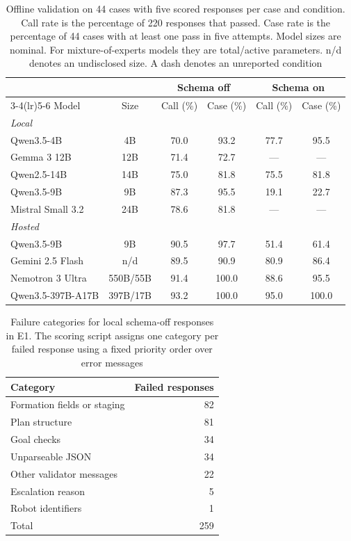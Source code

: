 \documentclass[pdflatex,sn-mathphys-num]{sn-jnl}
\begin{document}
\begin{table}[!htbp]
\centering
\caption{Offline validation on 44 cases with five scored responses per case
and condition. Call rate is the percentage of 220 responses that passed.
Case rate is the percentage of 44 cases with at least one pass in five
attempts. Model sizes are nominal. For mixture-of-experts models they are
total/active parameters. n/d denotes an undisclosed size. A dash denotes an
unreported condition}
\label{tab:e1}
\setlength{\tabcolsep}{3.2pt}
\begin{tabular}{lccccc}
\toprule
& & \multicolumn{2}{c}{Schema off} & \multicolumn{2}{c}{Schema on} \\
\cmidrule(lr){3-4}\cmidrule(lr){5-6}
Model & Size & Call (\%) & Case (\%) & Call (\%) & Case (\%) \\
\midrule
\multicolumn{6}{l}{\emph{Local}}\\
Qwen3.5-4B & 4B & 70.0 & 93.2 & 77.7 & 95.5 \\
Gemma 3 12B & 12B & 71.4 & 72.7 & --- & --- \\
Qwen2.5-14B & 14B & 75.0 & 81.8 & 75.5 & 81.8 \\
Qwen3.5-9B & 9B & 87.3 & 95.5 & 19.1 & 22.7 \\
Mistral Small 3.2 & 24B & 78.6 & 81.8 & --- & --- \\
\midrule
\multicolumn{6}{l}{\emph{Hosted}}\\
Qwen3.5-9B & 9B & 90.5 & 97.7 & 51.4 & 61.4 \\
Gemini 2.5 Flash & n/d & 89.5 & 90.9 & 80.9 & 86.4 \\
Nemotron 3 Ultra & 550B/55B & 91.4 & 100.0 & 88.6 & 95.5 \\
Qwen3.5-397B-A17B & 397B/17B & 93.2 & 100.0 & 95.0 & 100.0 \\
\bottomrule
\end{tabular}
\end{table}

\begin{table}[!htbp]
\centering
\caption{Failure categories for local schema-off responses in E1. The
scoring script assigns one category per failed response using a fixed
priority order over error messages}
\label{tab:e1errors}
\begin{tabular}{lr}
\toprule
Category & Failed responses \\
\midrule
Formation fields or staging & 82 \\
Plan structure & 81 \\
Goal checks & 34 \\
Unparseable JSON & 34 \\
Other validator messages & 22 \\
Escalation reason & 5 \\
Robot identifiers & 1 \\
\midrule
Total & 259 \\
\bottomrule
\end{tabular}
\end{table}
\end{document}
